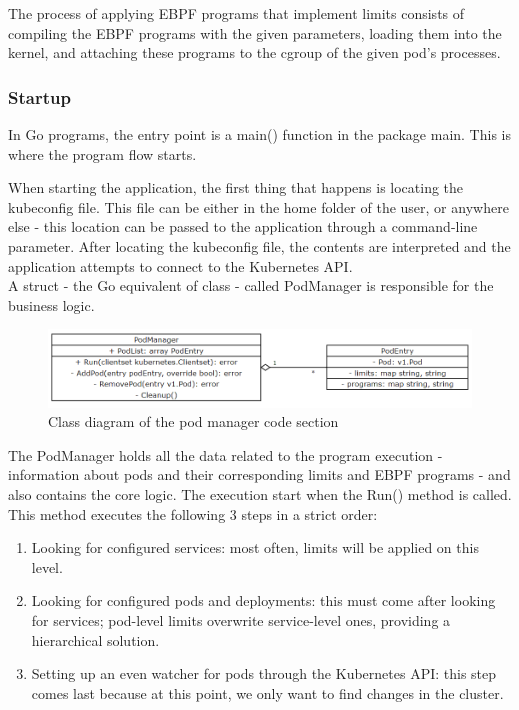 The process of applying EBPF programs that implement limits consists of compiling the EBPF programs with the given parameters, loading them into the kernel, and attaching these programs to the cgroup of the given pod's processes.

\subsubsection{Startup}
In Go programs, the entry point is a main() function in the package main. This is where the program flow starts.

When starting the application, the first thing that happens is locating the kubeconfig file. This file can be either in the home folder of the user, or anywhere else - this location can be passed to the application through a command-line parameter. After locating the kubeconfig file, the contents are interpreted and the application attempts to connect to the Kubernetes API. \\

A struct - the Go equivalent of class - called PodManager is responsible for the business logic. 
\begin{figure}[H]
	\centering
	\includegraphics[width=\textwidth]{images/uml.png}
	\caption{Class diagram of the pod manager code section}
	\label{fig:uml}
\end{figure}

The PodManager holds all the data related to the program execution - information about pods and their corresponding limits and EBPF programs - and also contains the core logic. The execution start when the Run() method is called. This method executes the following 3 steps in a strict order:

\begin{enumerate}
	\item Looking for configured services: most often, limits will be applied on this level.
	\item Looking for configured pods and deployments: this must come after looking for services; pod-level limits overwrite service-level ones, providing a hierarchical solution.
	\item Setting up an even watcher for pods through the Kubernetes API: this step comes last because at this point, we only want to find changes in the cluster.
\end{enumerate}

